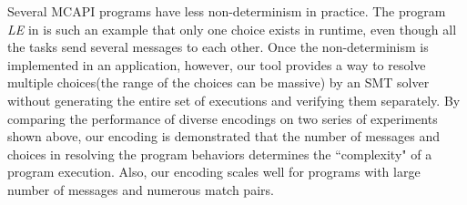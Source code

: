 Several MCAPI programs have less non-determinism in practice. The program \textit{LE} in  is such an example that only one choice exists in runtime, even though all the tasks send several messages to each other. Once the non-determinism is implemented in an application, however, our tool provides a way to resolve multiple choices(the range of the choices can be massive) by an SMT solver without generating the entire set of executions and verifying them separately. By comparing the performance of diverse encodings on two series of experiments shown above, our encoding is demonstrated that the number of messages and choices in resolving the program behaviors determines the ``complexity" of a program execution. Also, our encoding scales well for programs with large number of messages and numerous match pairs.

